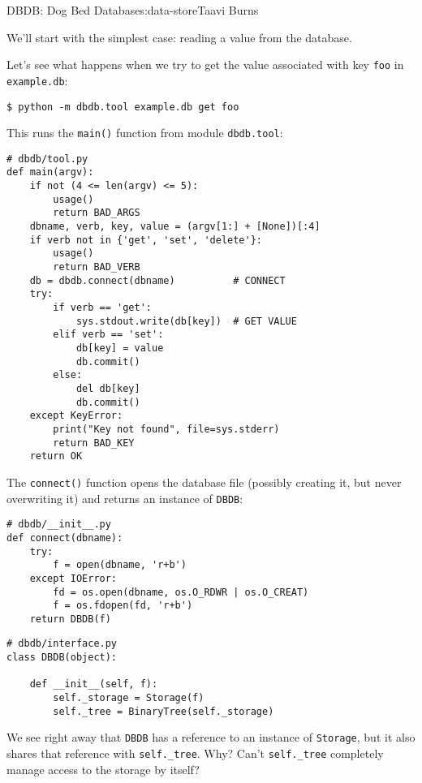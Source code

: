 \begin{aosachapter}{DBDB: Dog Bed Database}{s:data-store}{Taavi Burns}
\label{reading-a-value}

We'll start with the simplest case: reading a value from the database.

Let's see what happens when we try to get the value associated with key
\texttt{foo} in \texttt{example.db}:

\begin{verbatim}
$ python -m dbdb.tool example.db get foo
\end{verbatim}

This runs the \texttt{main()} function from module \texttt{dbdb.tool}:

\begin{verbatim}
# dbdb/tool.py
def main(argv):
    if not (4 <= len(argv) <= 5):
        usage()
        return BAD_ARGS
    dbname, verb, key, value = (argv[1:] + [None])[:4]
    if verb not in {'get', 'set', 'delete'}:
        usage()
        return BAD_VERB
    db = dbdb.connect(dbname)          # CONNECT
    try:
        if verb == 'get':
            sys.stdout.write(db[key])  # GET VALUE
        elif verb == 'set':
            db[key] = value
            db.commit()
        else:
            del db[key]
            db.commit()
    except KeyError:
        print("Key not found", file=sys.stderr)
        return BAD_KEY
    return OK
\end{verbatim}

The \texttt{connect()} function opens the database file (possibly
creating it, but never overwriting it) and returns an instance of
\texttt{DBDB}:

\begin{verbatim}
# dbdb/__init__.py
def connect(dbname):
    try:
        f = open(dbname, 'r+b')
    except IOError:
        fd = os.open(dbname, os.O_RDWR | os.O_CREAT)
        f = os.fdopen(fd, 'r+b')
    return DBDB(f)
\end{verbatim}

\begin{verbatim}
# dbdb/interface.py
class DBDB(object):

    def __init__(self, f):
        self._storage = Storage(f)
        self._tree = BinaryTree(self._storage)
\end{verbatim}

We see right away that \texttt{DBDB} has a reference to an instance of
\texttt{Storage}, but it also shares that reference with
\texttt{self.\_tree}. Why? Can't \texttt{self.\_tree} completely manage
access to the storage by itself?


\end{aosachapter}
